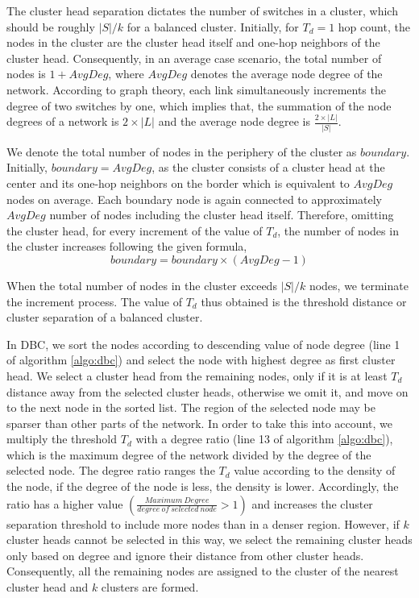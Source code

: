 \documentclass{IEEEtran}
\begin{document}
	
	The cluster head separation dictates the number of switches in a cluster, which should be roughly $|S|/k$ for a balanced cluster. Initially, for $T_d=1$ hop count, the nodes in the cluster are the cluster head itself and one-hop neighbors of the cluster head. Consequently, in an average case scenario, the total number of nodes is $1+AvgDeg$, where $AvgDeg$ denotes the average node degree of the network. According to graph theory, each link simultaneously increments the degree of two switches by one, which implies that, the summation of the node degrees of a network is $2\times |L|$ and the average node degree is $\frac{2\times |L|}{|S|}$.
	
	We denote the total number of nodes in the periphery of the cluster as $boundary$. Initially, $boundary=AvgDeg$, as the cluster consists of a cluster head at the center and its one-hop neighbors on the border which is equivalent to $AvgDeg$ nodes on average. Each boundary node is again connected to approximately $AvgDeg$ number of nodes including the cluster head itself. Therefore, omitting the cluster head, for every increment of the value of $T_d$, the number of nodes in the cluster increases following the given formula,
	\begin{equation} \label{eqn:clusterIncrease}
	boundary = boundary \times (AvgDeg - 1)
	\end{equation}
	
	When the total number of nodes in the cluster exceeds $|S|/k$ nodes, we terminate the increment process. The value of $T_d$ thus obtained is the threshold distance or cluster separation of a balanced cluster.
	
	In DBC, we sort the nodes according to descending value of node degree (line 1 of algorithm \ref{algo:dbc}) and select the node with highest degree as first cluster head. We select a cluster head from the remaining nodes, only if it is at least $T_d$ distance away from the selected cluster heads, otherwise we omit it, and move on to the next node in the sorted list. The region of the selected node may be sparser than other parts of the network. In order to take this into account, we multiply the threshold $T_d$ with a degree ratio (line 13 of algorithm \ref{algo:dbc}), which is the maximum degree of the network divided by the degree of the selected node. The degree ratio ranges the $T_d$ value according to the density of the node, if the degree of the node is less, the density is lower. Accordingly, the ratio has a higher value $(\frac{Maximum~Degree}{degree~of~selected~node}>1)$ and increases the cluster separation threshold to include more nodes than in a denser region. However, if $k$ cluster heads cannot be selected in this way, we select the remaining cluster heads only based on degree and ignore their distance from other cluster heads. Consequently, all the remaining nodes are assigned to the cluster of the nearest cluster head and $k$ clusters are formed.
	
\end{document}
